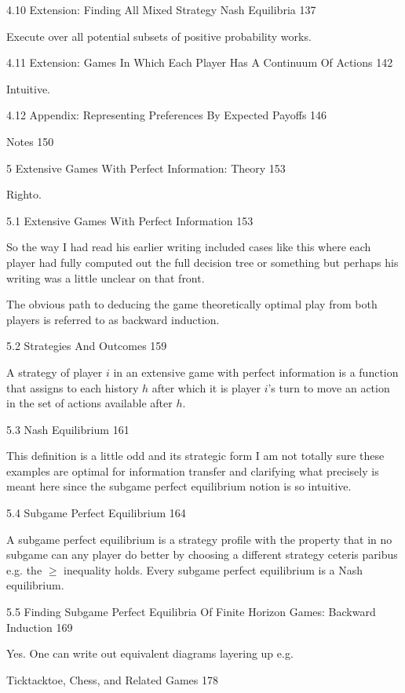 4.10 Extension: Finding All Mixed Strategy Nash Equilibria 137

Execute over all potential subsets of positive probability works.

4.11 Extension: Games In Which Each Player Has A Continuum Of Actions 142

Intuitive.

4.12 Appendix: Representing Preferences By Expected Payoffs 146



Notes 150



5 Extensive Games With Perfect Information: Theory 153

Righto.

5.1 Extensive Games With Perfect Information 153

So the way I had read his earlier writing included cases like this where each player had fully computed out the full decision tree or something but perhaps his writing was a little unclear on that front.

The obvious path to deducing the game theoretically optimal play from both players is referred to as backward induction.

5.2 Strategies And Outcomes 159

A strategy of player $i$ in an extensive game with perfect information is a function that assigns to each history $h$ after which it is player $i$'s turn to move an action in the set of actions available after $h$.

5.3 Nash Equilibrium 161

This definition is a little odd and its strategic form I am not totally sure these examples are optimal for information transfer and clarifying what precisely is meant here since the subgame perfect equilibrium notion is so intuitive.

5.4 Subgame Perfect Equilibrium 164

A subgame perfect equilibrium is a strategy profile with the property that in no subgame can any player do better by choosing a different strategy ceteris paribus e.g. the $\ge$ inequality holds. Every subgame perfect equilibrium is a Nash equilibrium.

5.5 Finding Subgame Perfect Equilibria Of Finite Horizon Games: Backward Induction 169

Yes. One can write out equivalent diagrams layering up e.g.

Ticktacktoe, Chess, and Related Games 178



